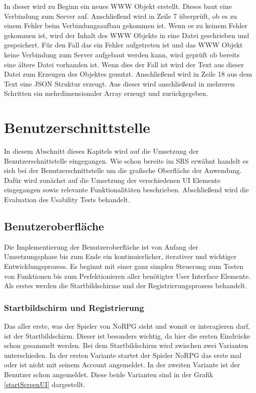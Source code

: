 				In dieser wird zu Beginn ein neues WWW Objekt erstellt. Dieses baut eine Verbindung zum Server auf. Anschließend wird in Zeile 7 überprüft, ob es zu einem Fehler beim Verbindungsaufbau gekommen ist. Wenn es zu keinem Fehler gekommen ist, wird der Inhalt des WWW Objekts in eine Datei geschrieben und gespeichert. Für den Fall das ein Fehler aufgetreten ist und das WWW Objekt keine Verbindung zum Server aufgebaut werden kann, wird geprüft ob bereits eine ältere Datei vorhanden ist. Wenn dies der Fall ist wird der Text aus dieser Datei zum Erzeugen des Objektes genutzt. Anschließend wird in Zeile 18 aus dem Text eine \ac{JSON} Struktur erzeugt. Aus dieser wird anschließend in mehreren Schritten ein mehrdimensionaler Array erzeugt und zurückgegeben.

			\section{Benutzerschnittstelle}
		In diesem Abschnitt dieses Kapitels wird auf die Umsetzung der Benutzerschnittstelle eingegangen. Wie schon bereits im \ac{SRS} erwähnt handelt es sich bei der Benutzerschnittstelle um die grafische Oberfläche der Anwendung. Dafür wird zunächst auf die Umsetzung der verschiedenen \ac{UI} Elemente eingegangen sowie relevante Funktionalitäten beschrieben. Abschließend wird die Evaluation des Usability Tests behandelt. 

		\label{joystik}
		\subsection{Benutzeroberfläche}	
			Die Implementierung der Benutzeroberfläche ist von Anfang der Umsetzungsphase bis zum Ende ein kontinuierlicher, iterativer und wichtiger Entwicklungsprozess. Es beginnt mit einer ganz simplen Steuerung zum Testen von Funktionen bis zum Perfektionieren aller benötigter User Interface Elemente. Als erstes werden die Startbildschirme und der Registrierungsprozess behandelt. 

			\subsubsection{Startbildschirm und Registrierung}
				Das aller erste, was der Spieler von NoRPG sieht und womit er interagieren darf, ist der Startbildschirm. Dieser ist besonders wichtig, da hier die ersten Eindrücke schon gesammelt werden. Bei dem Startbildschirm wird zwischen zwei Varianten unterschieden. In der ersten Variante startet der Spieler NoRPG das erste mal oder ist nicht mit seinem Account angemeldet. In der zweiten Variante ist der Benutzer schon angemeldet. Diese beide Varianten sind in der Grafik \ref{startScreenUI} dargestellt.

